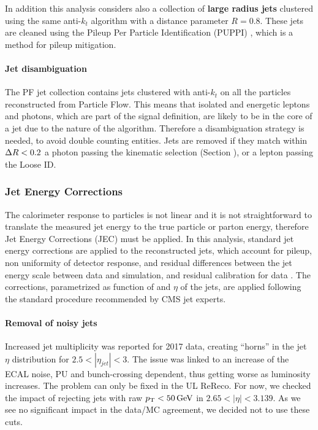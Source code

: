 In addition this analysis considers also a collection of \textbf{large radius jets} clustered using the same anti-$k_t$ algorithm with a distance parameter $R = 0.8$.
These jets are cleaned using the Pileup Per Particle Identification (PUPPI) \cite{Bertolini_2014}, which is a method for pileup mitigation.

\paragraph{Jet disambiguation\\}
The PF jet collection contains jets clustered with anti-$k_t$ on all the particles reconstructed from Particle Flow.
This means that isolated and energetic leptons and photons, which are part of the signal definition,
are likely to be in the core of a jet due to the nature of the algorithm.
Therefore a disambiguation strategy is needed, to avoid double counting entities.
Jets are removed if they match within $\Delta R < 0.2$ a photon passing the kinematic selection (Section ),
or a lepton passing the Loose ID.

\subsubsection{Jet Energy Corrections}

The calorimeter response to particles is not linear and it is not straightforward to translate the measured jet energy
to the true particle or parton energy, therefore Jet Energy Corrections (JEC) must be applied.
In this analysis, standard jet energy corrections are applied to the reconstructed jets, which account for pileup,
non uniformity of detector response, and residual differences between the jet energy scale between data and simulation, and residual calibration for data
\cite{CMS:JEC_2011, CMS-DP-2016-020, CMS-DP-2021-033}.
The corrections, parametrized as function of \pt and $\eta$ of the jets, are applied following the standard procedure recommended by CMS jet experts.

\paragraph{Removal of noisy jets\\}
Increased jet multiplicity was reported for 2017 data, creating ``horns'' in the jet $\eta$ distribution for $2.5<|\eta_{jet}|<3$.
The issue was linked to an increase of the ECAL noise, PU and bunch-crossing dependent, thus getting worse as luminosity increases.
The problem can only be fixed in the UL ReReco.
For now, we checked the impact of rejecting jets with raw $p_{\mathrm{T}} < 50 \,\text{Ge\hspace{-.08em}V}$ in $2.65 <|\eta| < 3.139$.
As we see no significant impact in the data/MC agreement, we decided not to use these cuts.

